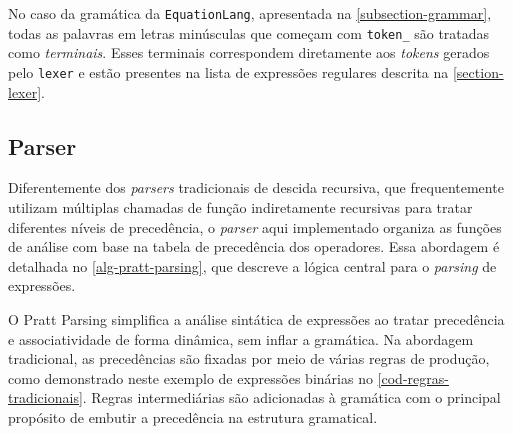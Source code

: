 No caso da gramática da \texttt{EquationLang}, apresentada na \autoref{subsection-grammar}, todas as palavras em letras minúsculas que começam com \texttt{token\_} são tratadas como \textit{terminais}. Esses terminais correspondem diretamente aos \textit{tokens} gerados pelo \texttt{lexer} e estão presentes na lista de expressões regulares descrita na \autoref{section-lexer}.

%
%
%




\subsection{Parser} \label{section-parser-pratt}
Diferentemente dos \textit{parsers} tradicionais de descida recursiva, que frequentemente utilizam múltiplas chamadas de função indiretamente recursivas para tratar diferentes níveis de precedência, o \textit{parser} aqui implementado organiza as funções de análise com base na tabela de precedência dos operadores. Essa abordagem é detalhada no \autoref{alg-pratt-parsing}, que descreve a lógica central para o \textit{parsing} de expressões.

O Pratt Parsing simplifica a análise sintática de expressões ao tratar precedência e associatividade de forma dinâmica, sem inflar a gramática. Na abordagem tradicional, as precedências são fixadas por meio de várias regras de produção, como demonstrado neste exemplo de expressões binárias no \autoref{cod-regras-tradicionais}. Regras intermediárias são adicionadas à gramática com o principal propósito de embutir a precedência na estrutura gramatical.

